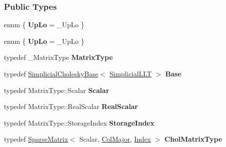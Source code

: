 \subsubsection*{Public Types}
\begin{DoxyCompactItemize}
\item 
\mbox{\label{group___sparse_cholesky___module_a1f6d3b57c51ccd597f1f39f5ad64210a}} 
enum \{ {\bfseries Up\+Lo} = \+\_\+\+Up\+Lo
 \}
\item 
\mbox{\label{group___sparse_cholesky___module_aef761f7b12d58049a34fa1d5dcfcd603}} 
enum \{ {\bfseries Up\+Lo} = \+\_\+\+Up\+Lo
 \}
\item 
\mbox{\label{group___sparse_cholesky___module_ae8b3a9509f9141d13419b8442f878688}} 
typedef \+\_\+\+Matrix\+Type {\bfseries Matrix\+Type}
\item 
\mbox{\label{group___sparse_cholesky___module_a97bc8661414c73c1a4da984466238741}} 
typedef \hyperlink{group___sparse_cholesky___module_class_eigen_1_1_simplicial_cholesky_base}{Simplicial\+Cholesky\+Base}$<$ \hyperlink{group___sparse_cholesky___module_class_eigen_1_1_simplicial_l_l_t}{Simplicial\+L\+LT} $>$ {\bfseries Base}
\item 
\mbox{\label{group___sparse_cholesky___module_ac01f03cb8ea25d9a4620c23ef1596c38}} 
typedef Matrix\+Type\+::\+Scalar {\bfseries Scalar}
\item 
\mbox{\label{group___sparse_cholesky___module_ad3b3cf7792b2e63ecaf2f5b10831bc10}} 
typedef Matrix\+Type\+::\+Real\+Scalar {\bfseries Real\+Scalar}
\item 
\mbox{\label{group___sparse_cholesky___module_a3ab91aa2067c30dc716b1216902da13d}} 
typedef Matrix\+Type\+::\+Storage\+Index {\bfseries Storage\+Index}
\item 
\mbox{\label{group___sparse_cholesky___module_ac222849c2fc32aba42173375b4aa550f}} 
typedef \hyperlink{group___sparse_core___module_class_eigen_1_1_sparse_matrix}{Sparse\+Matrix}$<$ Scalar, \hyperlink{group__enums_ggaacded1a18ae58b0f554751f6cdf9eb13a0cbd4bdd0abcfc0224c5fcb5e4f6669a}{Col\+Major}, \hyperlink{namespace_eigen_a62e77e0933482dafde8fe197d9a2cfde}{Index} $>$ {\bfseries Chol\+Matrix\+Type}

\end{DoxyCompactItemize}
